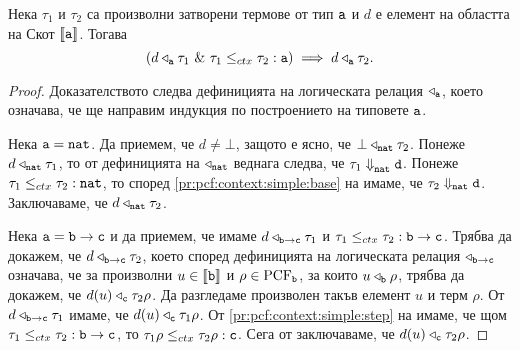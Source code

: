\begin{proposition}\label{pr:pcf:context:relation}
  Нека $\tau_1$ и $\tau_2$ са произволни затворени термове от тип $\texttt{a}$ и $d$ е елемент на областта на Скот $\llbracket{\texttt{a}}\rrbracket$. Тогава
  \[(d \triangleleft_{\texttt{a}} \tau_1\ \&\ \tau_1 \leq_{ctx} \tau_2 : \texttt{a}) \implies d \triangleleft_{\texttt{a}} \tau_2.\]
\end{proposition}
\begin{proof}
  Доказателството следва дефиницията на логическата релация $\triangleleft_{\texttt{a}}$, което означава, че
  ще направим индукция по построението на типовете $\texttt{a}$.

  Нека $\texttt{a} = \texttt{nat}$.
  Да приемем, че $d \neq \bot$, защото е ясно, че $\bot \triangleleft_{\texttt{nat}} \tau_2$.
  Понеже $d \triangleleft_{\texttt{nat}} \tau_1$, то от дефиницията на $\triangleleft_{\texttt{nat}}$ веднага следва, че $\tau_1 \Downarrow^{}_{\texttt{nat}} \texttt{d}$.
  Понеже $\tau_1 \leq_{ctx} \tau_2 : \texttt{nat}$, то според \ref{pr:pcf:context:simple:base} на  имаме, че $\tau_2 \Downarrow_{\texttt{nat}} \texttt{d}$. Заключаваме, че $d \triangleleft_{\texttt{nat}} \tau_2$.
  
  Нека $\texttt{a} = \texttt{b} \to \texttt{c}$ и да приемем, че имаме $d \triangleleft_{\texttt{b} \to \texttt{c}} \tau_1$ и $\tau_1 \leq_{ctx} \tau_2 : \texttt{b}\to\texttt{c}$.
  Трябва да докажем, че $d \triangleleft_{\texttt{b}\to\texttt{c}} \tau_2$, което според дефиницията на логическата релация $\triangleleft_{\texttt{b}\to\texttt{c}}$ означава,
  че за произволни $u \in \llbracket{\texttt{b}}\rrbracket$ и $\rho \in \text{PCF}_{\texttt{b}}$, за които $u \triangleleft_{\texttt{b}} \rho$, трябва да докажем, че $d(u) \triangleleft_{\texttt{c}} \tau_2\rho$.
  Да разгледаме произволен такъв елемент $u$ и терм $\rho$. 
  От $d \triangleleft_{\texttt{b} \to \texttt{c}} \tau_1$ имаме, че $d(u) \triangleleft_{\texttt{c}} \tau_1 \rho$.
  От \ref{pr:pcf:context:simple:step} на  имаме, че щом $\tau_1 \leq_{ctx} \tau_2 : \texttt{b} \to \texttt{c}$, то $\tau_1 \rho \leq_{ctx} \tau_2 \rho : \texttt{c}$.
  Сега от \IndHyp заключаваме, че $d(u) \triangleleft_{\texttt{c}} \tau_2 \rho$.
\end{proof}


